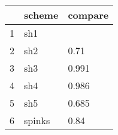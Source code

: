 \begin{table}[ht]
\centering
\begin{tabular}{rll}
  \hline
 & scheme & compare \\ 
  \hline
1 & sh1 &  \\ 
  2 & sh2 & 0.71 \\ 
  3 & sh3 & 0.991 \\ 
  4 & sh4 & 0.986 \\ 
  5 & sh5 & 0.685 \\ 
  6 & spinks & 0.84 \\ 
   \hline
\end{tabular}
\label{lldif}
\end{table}
